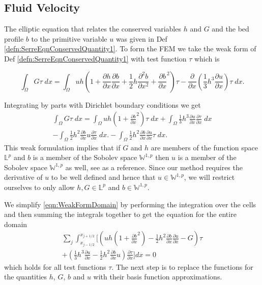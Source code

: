 \subsection{Fluid Velocity}
The elliptic equation that relates the conserved variables $h$ and $G$ and the bed profile $b$ to the primitive variable $u$ was given in Def \ref{defn:SerreEqnConservedQuantity1}. To form the FEM we take the weak form of Def \ref{defn:SerreEqnConservedQuantity1} with test function $\tau$ which is 

\begin{equation*}
	\int_{\Omega } G \tau \; dx =  \int_{\Omega } uh \left(1 + \frac{\partial h}{\partial x}\frac{\partial b}{\partial x} + \frac{1}{2}h\frac{\partial^2 b}{\partial x^2} + \frac{\partial b}{\partial x}^2 \right) \tau - \frac{\partial}{\partial x}\left(\frac{1}{3}h^3  \frac{\partial {u}}{\partial x}\right) \tau \; dx.
\end{equation*}

Integrating by parts with Dirichlet boundary conditions we get
\begin{multline}
\int_{\Omega } G \tau \; dx = \int_{\Omega } uh \left(1 + \frac{\partial b}{\partial x}^2 \right) \tau \; dx +  \int_{\Omega } \frac{1}{3}h^3  \frac{\partial {u}}{\partial x} \frac{\partial \tau}{\partial x} \; dx  \\ - 
\int_{\Omega }   \frac{1}{2}h^2\frac{\partial b}{\partial x} u \frac{\partial \tau }{\partial x}\; dx. - 
\int_{\Omega }   \frac{1}{2}h^2\frac{\partial b}{\partial x}  \frac{\partial u }{\partial x}\tau \; dx.
\label{eqn:WeakFormDomain}
\end{multline}
This weak formulation implies that if $G$ and $h$ are members of the function space $\mathbb{L}^p$ and $b$ is a member of the Sobolev space $\mathbb{W}^{1,p}$ then $u$ is a member of the Sobolev space $\mathbb{W}^{1,p}$ as well, see \citet{EvansPDE-1998} as a reference. Since our method requires the derivative of $u$ to be well defined and hence that $u \in \mathbb{W}^{1,p}$, we will restrict ourselves to only allow $h,G \in \mathbb{L}^p$ and $b \in \mathbb{W}^{1,p}$.

We simplify \eqref{eqn:WeakFormDomain} by performing the integration over the cells and then summing the integrals together to get the equation for the entire domain
\begin{multline}
\label{eq:elementwiseint}
 \sum_{j}  \int_{x_{j-1/2} }^{{x_{j+1/2}}} \Bigg[  \left( uh \left(1 + \frac{\partial b}{\partial x}^2 \right)  - \frac{1}{2}h^2\frac{\partial b}{\partial x}  \frac{\partial u }{\partial x}  -  G \right) \tau   \\ +  \left( \frac{1}{3}h^3  \frac{\partial {u}}{\partial x}    -     \frac{1}{2}h^2\frac{\partial b}{\partial x} u    \right) \frac{\partial \tau }{\partial x} \Bigg]dx  = 0
\end{multline}
which holds for all test functions $\tau$. The next step is to replace the functions for the quantities $h$, $G$, $b$ and $u$ with their basis function approximations. 

